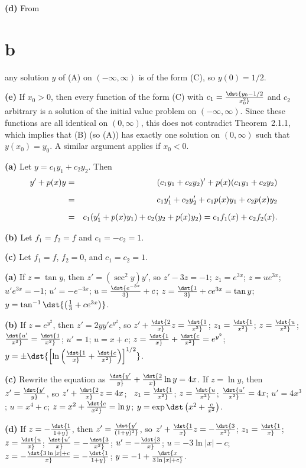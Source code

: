\documentclass[dvips]{book}
\renewcommand{\exer}[1]{\par\medskip\;\noindent{\color{red}\bf #1.}}
\numberwithin{example}{section}
\numberwithin{equation}{section}
\numberwithin{theorem}{section}
\numberwithin{table}{section}
\numberwithin{figure}{section}
\begin{document}
{\bf (d)} From \part{b} any solution $y$ of (A) on
$(-\infty,\infty)$ is of the form (C), so
$y(0)=1/2$.

{\bf (e)} If $x_0>0$, then every function of the form
(C) with $c_1=\dst{y_0-1/2\over x_0^2}$ and $c_2$
arbitrary is a solution of the initial value problem on
$(-\infty,\infty)$. Since these functions are all identical on
$(0,\infty)$, this does not contradict Theorem~2.1.1, which
implies that (B) (so
(A)) has exactly one solution on $(0,\infty)$ such
that $y(x_0)=y_0$. A similar argument applies if $x_0<0$.


\exer{2.1.46}
{\bf (a)} Let $y=c_1y_1+c_2y_2$. Then
\begin{eqnarray*}
y'+p(x)y&=&(c_1y_1+c_2y_2)'+p(x)(c_1y_1+c_2y_2)\\[2\jot]
&=&c_1y_1'+c_2y_2'+c_1p(x)y_1+c_2p(x)y_2\\[2\jot]
&=&c_1(y_1'+p(x)y_1)+c_2(y_2+p(x)y_2)=c_1f_1(x)+c_2f_2(x).
\end{eqnarray*}

{\bf (b)}  Let $f_1=f_2=f$ and $c_1=-c_2=1$.

{\bf (c)}  Let $f_1=f$, $f_2=0$, and $c_1=c_2=1$.



\exer{2.1.48}
{\bf (a)}
If $z=\tan y$, then $z'=(\sec^2y)y'$, so $z'-3z=-1$;\;
$z_1=e^{3x}$;\;
$z=ue^{3x}$;\;
$u'e^{3x}=-1$;\;
$u'=-e^{-3x}$;\;
$u=\dst{e^{-3x}\over3}+c$;\;
$z=\dst{1\over3}+ce^{3x}=\tan y$;\;
$y=\tan^{-1}\dst{\left({1\over3}+ce^{3x}\right)}$.



{\bf (b)}
If $z=e^{y^2}$, then $z'=2yy'e^{y^2}$, so $z'+\dst{2\over
x}z=\dst{1\over x^2}$;\;
$z_1=\dst{1\over x^2}$;\;
$z=\dst{u\over x^2}$;\;
$\dst{u'\over x^2}=\dst{1\over x^2}$;\;
$u'=1$;\;
$u=x+c$;\;
$z=\dst{1\over x}+\dst{c\over x^2}=e^{y^2}$;\;
$y=\pm\dst{\left[\ln\left(\dst{1\over x}+\dst{c\over
x^2}\right)\right]^{1/2}}$.


{\bf (c)}
Rewrite the equation as $\dst{y'\over y}+\dst{2\over x}\ln y=4x$.
If $z=\ln y$, then $z'=\dst{y'\over y}$, so $z'+\dst{2\over x}z=4x$;
\
$z_1=\dst{1\over x^2}$;\;
$z=\dst{u\over x^2}$;\;
$\dst{u'\over x^2}=4x$;\;
$u'=4x^3$;\;
$u=x^4+c$;\;
$z=x^2+\dst{c\over x^2}=\ln y$;\;
$y=\exp\dst\left(x^2+{c\over x^2}\right)$.


{\bf (d)}
If $z=-\dst{1\over 1+y}$, then $z'=\dst{y'\over(1+y)^2}$, so
$z'+\dst{1\over x}z=-\dst{3\over x^2}$;\;
$z_1=\dst{1\over x}$;\;
$z=\dst{u\over x}$;\;
$\dst{u'\over x}=-\dst{3\over x^2}$;\;
$u'=-\dst{3\over x}$;\;
$u=-3\ln|x|-c$;\;
$z=-\dst{3\ln|x|+c\over x}=-\dst{1\over1+y}$;\;
$y=-1+\dst{x\over3\ln|x|+c}$.
\end{document}
